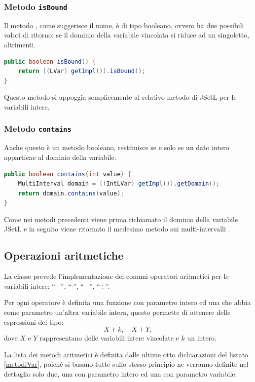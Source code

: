 \subsubsection{Metodo \texttt{isBound}}
Il metodo , come suggerisce il nome, è di tipo booleano, ovvero
ha due possibili valori di ritorno:  se il dominio della variabile
vincolata si riduce ad un singoletto,  altrimenti.
\begin{lstlisting}[language = Java,
                   caption = {\files{isBound}.}]
public boolean isBound() {
	return ((LVar) getImpl()).isBound();
}
\end{lstlisting}
Questo metodo si appoggia semplicemente al relativo metodo di JSetL per le
variabili intere.

\subsubsection{Metodo \texttt{contains}}
Anche questo è un metodo booleano, restituisce  se e solo se
un dato intero appartiene al dominio della variabile.
\begin{lstlisting}[language = Java,
                   caption = {\files{contains}.}]
public boolean contains(int value) {
	MultiInterval domain = ((IntLVar) getImpl()).getDomain();
	return domain.contains(value);
}
\end{lstlisting}
Come nei metodi precedenti viene prima richiamato il dominio della variabile
JSetL e in seguito viene ritornato il medesimo metodo sui multi-intervalli
.

\subsection{Operazioni aritmetiche}
La classe  prevede l'implementazione dei comuni operatori
aritmetici per le variabili intere: ``$+$'', ``$\cdot$'', ``$-$'', ``$\div$''.

Per ogni operatore è definita una funzione con parametro intero ed una che abbia
come parametro un'altra variabile intera, questo permette di ottenere delle
espressioni del tipo:
\[
X + k, \quad X + Y,
\]
dove $X$ e $Y$ rappresentano delle variabili intere vincolate e $k$ un intero.

La lista dei metodi aritmetici è definita dalle ultime otto dichiarazioni
del listato \ref{metodiVar}, poiché si basano tutte sullo stesso principio ne
verranno definite nel dettaglio solo due, una con parametro intero ed
una con parametro variabile.

